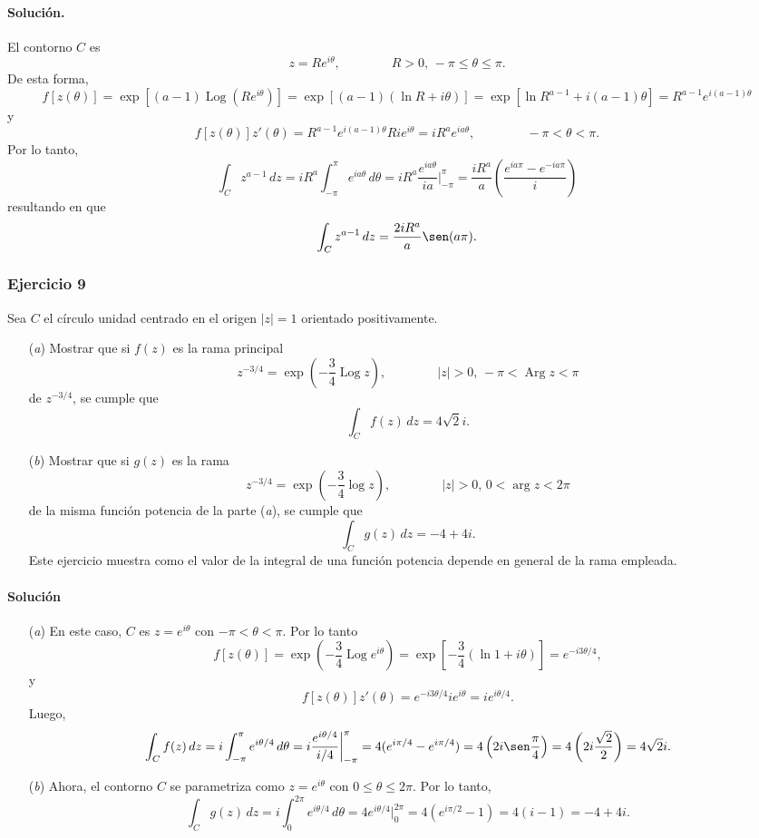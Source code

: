\documentclass[a4paper]{report}
\DeclareMathOperator{\Arg}{Arg}
\DeclareMathOperator{\Log}{Log}
\begin{document}
\paragraph{Solución.} El contorno \(C\) es
\[
 z=Re^{i\theta},
 \qquad\qquad
 R>0,\,-\pi\leq\theta\leq\pi.
\]
De esta forma,
\[
 f[z(\theta)]=\exp\left[(a-1)\Log(Re^{i\theta})\right]=\exp\left[(a-1)(\ln R+i\theta)\right]
  =\exp\left[\ln R^{a-1}+i(a-1)\theta\right]=R^{a-1}e^{i(a-1)\theta}
\]
y
\begin{equation}\label{eq:exercise_46_08_integrand}
  f[z(\theta)]z'(\theta)=R^{a-1}e^{i(a-1)\theta}Rie^{i\theta}=iR^ae^{ia\theta},
 \qquad\qquad
 -\pi<\theta<\pi.
\end{equation}
Por lo tanto,
\[
 \int_C z^{a-1}\,dz=iR^a\int_{-\pi}^{\pi}e^{ia\theta}\,d\theta=iR^a\frac{e^{ia\theta}}{ia}\bigg|_{-\pi}^{\pi}
  =\frac{iR^a}{a}\left(\frac{e^{ia\pi}-e^{-ia\pi}}{i}\right)
\]
resultando en que 
\[
 \int_C z^{a-1}\,dz=\frac{2iR^a}{a}\sen(a\pi).
\]

\subsubsection{Ejercicio 9}

Sea \(C\) el círculo unidad centrado en el origen \(|z|=1\) orientado positivamente.
\begin{enumerate}
 \item[(\textit{a})] Mostrar que si \(f(z)\) es la rama principal
 \[
  z^{-3/4}=\exp\left(-\frac{3}{4}\Log z\right),
 \qquad\qquad
 |z|>0,\,-\pi<\Arg z<\pi
 \]
 de \(z^{-3/4}\), se cumple que 
 \[
  \int_Cf(z)\,dz=4\sqrt{2}i.
 \]
 \item[(\textit{b})] Mostrar que si \(g(z)\) es la rama
 \[
  z^{-3/4}=\exp\left(-\frac{3}{4}\log z\right),
 \qquad\qquad
 |z|>0,\,0<\arg z<2\pi
 \]
 de la misma función potencia de la parte (\textit{a}), se cumple que 
 \[
  \int_Cg(z)\,dz=-4+4i.
 \]
 Este ejercicio muestra como el valor de la integral de una función potencia depende en general de la rama empleada.
\end{enumerate}

\paragraph{Solución}
\begin{enumerate}
 \item[(\textit{a})] En este caso, \(C\) es \(z=e^{i\theta}\) con \(-\pi<\theta<\pi\). Por lo tanto
 \[
  f[z(\theta)]=\exp\left(-\frac{3}{4}\Log e^{i\theta}\right)=\exp\left[-\frac{3}{4}(\ln1+i\theta)\right]=e^{-i3\theta/4},
 \]
 y
 \[
  f[z(\theta)]z'(\theta)=e^{-i3\theta/4}ie^{i\theta}=ie^{i\theta/4}.
 \]
 Luego,
 \[
  \int_Cf(z)\,dz=i\int_{-\pi}^\pi e^{i\theta/4}\,d\theta=i\frac{e^{i\theta/4}}{i/4}\bigg|_{-\pi}^\pi=4(e^{i\pi/4}-e^{i\pi/4})=4\left(2i\sen\frac{\pi}{4}\right)=4\left(2i\frac{\sqrt{2}}{2}\right)=4\sqrt{2}i.
 \]
 \item[(\textit{b})] Ahora, el contorno \(C\) se parametriza como \(z=e^{i\theta}\) con \(0\leq\theta\leq2\pi\). Por lo tanto, 
 \[
  \int_Cg(z)\,dz=i\int_0^{2\pi}e^{i\theta/4}\,d\theta=4e^{i\theta/4}\bigg|_0^{2\pi}=4(e^{i\pi/2}-1)=4(i-1)=-4+4i.
 \]
\end{enumerate}
\end{document}
